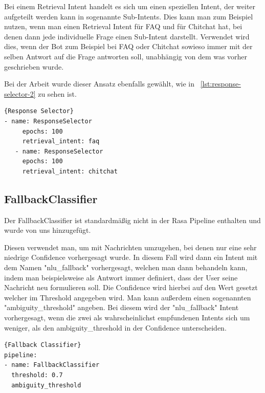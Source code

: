 Bei einem Retrieval Intent handelt es sich um einen speziellen Intent, der weiter aufgeteilt werden kann in sogenannte Sub-Intents.
Dies kann man zum Beispiel nutzen, wenn man einen Retrieval Intent für FAQ und für Chitchat hat, bei denen dann jede individuelle Frage einen Sub-Intent darstellt.\cite{retrievalIntent}
Verwendet wird dies, wenn der Bot zum Beispiel bei FAQ oder Chitchat sowieso immer mit der selben Antwort auf die Frage antworten soll, unabhängig von dem was vorher geschrieben wurde.\cite{chitchatAndFaqs}

Bei der Arbeit wurde dieser Ansatz ebenfalls gewählt, wie in ~\ref{lst:response-selector-2} zu sehen ist.

\begin{lstlisting}[label={lst:response-selector-2},caption={Response Selector für Chitchat und FAQ}]{Response Selector}
- name: ResponseSelector
     epochs: 100
     retrieval_intent: faq
   - name: ResponseSelector
     epochs: 100
     retrieval_intent: chitchat
\end{lstlisting}

\subsection{FallbackClassifier}

Der FallbackClassifier ist standardmäßig nicht in der Rasa Pipeline enthalten und wurde von uns hinzugefügt.\cite{startingPipelines}

Diesen verwendet man, um mit Nachrichten umzugehen, bei denen nur eine sehr niedrige Confidence vorhergesagt wurde.
In diesem Fall wird dann ein Intent mit dem Namen "nlu\_fallback" vorhergesagt, welchen man dann behandeln kann, indem man beispielsweise als Antwort immer definiert, dass der User seine Nachricht neu formulieren soll.
Die Confidence wird hierbei auf den Wert gesetzt welcher im Threshold angegeben wird.\cite{fallbackClassifier, nluFallback}
Man kann außerdem einen sogenannten "ambiguity\_threshold" angeben.
Bei diesem wird der "nlu\_fallback" Intent vorhergesagt, wenn die zwei als wahrscheinlichst empfundenen Intents sich um weniger, als den ambiguity\_threshold in der Confidence unterscheiden.\cite{fallbackClassifier}

\begin{lstlisting}[label={lst:fallback-classifier},caption={Fallback Classifier}]{Fallback Classifier}
pipeline:
- name: FallbackClassifier
  threshold: 0.7
  ambiguity_threshold
\end{lstlisting}



